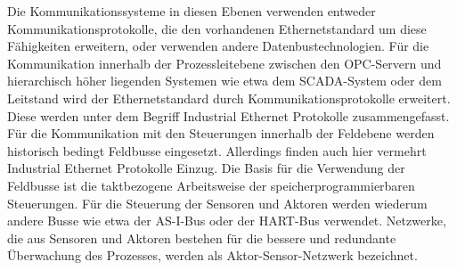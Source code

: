Die Kommunikationssysteme in diesen Ebenen verwenden entweder Kommunikationsprotokolle, die den vorhandenen Ethernetstandard um diese Fähigkeiten erweitern, oder verwenden andere Datenbustechnologien. Für die Kommunikation innerhalb der Prozessleitebene zwischen den OPC-Servern und hierarchisch höher liegenden Systemen wie etwa dem SCADA-System oder dem Leitstand wird der Ethernetstandard durch Kommunikationsprotokolle erweitert. Diese werden unter dem Begriff \glqq Industrial Ethernet\grqq{} Protokolle zusammengefasst. Für die Kommunikation mit den Steuerungen innerhalb der Feldebene werden historisch bedingt Feldbusse eingesetzt. Allerdings finden auch hier vermehrt Industrial Ethernet Protokolle Einzug. Die Basis für die Verwendung der Feldbusse ist die taktbezogene Arbeitsweise der speicherprogrammierbaren Steuerungen. Für die Steuerung der Sensoren und Aktoren werden wiederum andere Busse wie etwa der AS-I-Bus oder der HART-Bus verwendet. Netzwerke, die aus Sensoren und Aktoren bestehen für die bessere und redundante Überwachung des Prozesses, werden als Aktor-Sensor-Netzwerk bezeichnet.



